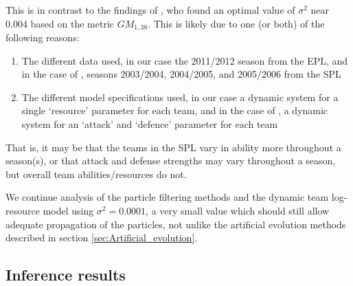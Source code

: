 This is in contrast to the findings of \cite{Owen2011}, who found an optimal value of \(\sigma^2\) near 0.004 based on
the metric \(GM_{1, 38}\). This is likely due to one (or both) of the following reasons:
\begin{enumerate}
  \item The different data used, in our case the 2011/2012 season from the \gls{EPL}, and in the case of
  \cite{Owen2011}, seasons 2003/2004, 2004/2005, and 2005/2006 from the \gls{SPL}
  \item The different model specifications used, in our case a dynamic system for a single `resource'
  parameter for each team, and in the case of \cite{Owen2011}, a dynamic system for an `attack'
  and `defence' parameter for each team
\end{enumerate}
That is, it may be that the teams in the \gls{SPL} vary in ability more throughout a season(s), or that attack and
defense strengths may vary throughout a season, but overall team abilities/resources do not.

We continue analysis of the particle filtering methods and the dynamic team log-resource model using \(\sigma^2 =
0.0001\), a very small value which should still allow adequate propagation of the particles, not unlike the artificial
evolution methods described in section \ref{sec:Artificial_evolution}.

\subsection{Inference results}
\label{sec:Inference_results}
 
